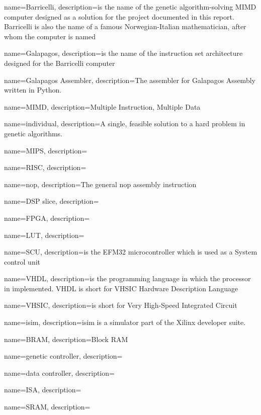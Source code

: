 {
name=Barricelli,
description={is the name of the genetic algorithm-solving MIMD computer designed as a solution for the project documented in this report. Barricelli is also the name of a famous Norwegian-Italian mathematician, after whom the computer is named}
}

{
name=Galapagos,
description={is the name of the instruction set architecture designed for the Barricelli computer}
}

{
name=Galapagos Assembler,
description={The assembler for Galapagos Assembly written in Python.}
}

{
name=MIMD,
description={Multiple Instruction, Multiple Data}
}

{
name=individual,
description={A single, feasible solution to a hard problem in genetic algorithms.}
}

{
name=MIPS,
description={}
}

{
name=RISC,
description={}
}

{
name=nop,
description={The general nop assembly instruction }
}

{
name=DSP slice,
description={}
}

{
name=FPGA,
description={}
}

{
name=LUT,
description={}
}

{
name=SCU,
description={is the EFM32 microcontroller which is used as a System control unit}
}

{
name=VHDL,
description={is the programming language in which the processor in implemented. VHDL is short for \gls{VHSIC} Hardware Description Language}
}

{
name=VHSIC,
description={is short for Very High-Speed Integrated Circuit}
}

{
name=isim,
description={isim is a simulator part of the Xilinx developer suite.}
}

{
name=BRAM,
description={Block RAM }
}

{
name=genetic controller,
description={}
}

{
name=data controller,
description={}
}

{
name=ISA,
description={}
}

{
name=SRAM,
description={}
}
